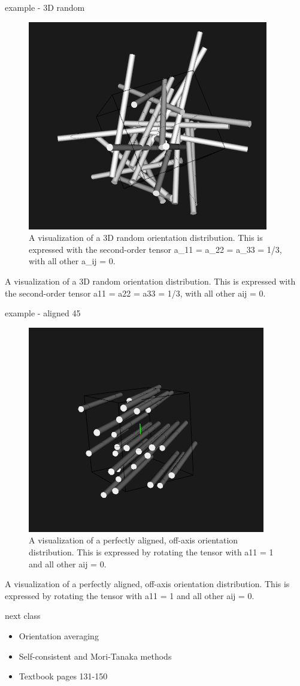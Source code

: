 \documentclass[
  letterpaper,
  ignorenonframetext,
  aspectratio=43,
  handout,
  12pt]{beamer}
\providecommand{\tightlist}{%
  \setlength{\itemsep}{0pt}\setlength{\parskip}{0pt}}
\providecommand{\tightlist}{%
\setlength{\itemsep}{0pt}\setlength{\parskip}{0pt}}
\let\Oldincludegraphics\includegraphics
\renewcommand{\includegraphics}[2][]{\Oldincludegraphics[width=\textwidth,height=0.7\textheight,keepaspectratio]{#2}}
\begin{document}
\begin{frame}{example - 3D random}
\protect\hypertarget{example---3d-random}{}
\begin{figure}
\centering
\includegraphics{../images/random3D.PNG}
\caption{A visualization of a 3D random orientation distribution. This
is expressed with the second-order tensor a\_11 = a\_22 = a\_33 = 1/3,
with all other a\_ij = 0.}
\end{figure}

A visualization of a 3D random orientation distribution. This is
expressed with the second-order tensor a11 = a22 = a33 = 1/3, with all
other aij = 0.
\end{frame}

\begin{frame}{example - aligned 45}
\protect\hypertarget{example---aligned-45}{}
\begin{figure}
\centering
\includegraphics{../images/aligned45.PNG}
\caption{A visualization of a perfectly aligned, off-axis orientation
distribution. This is expressed by rotating the tensor with a11 = 1 and
all other aij = 0.}
\end{figure}

A visualization of a perfectly aligned, off-axis orientation
distribution. This is expressed by rotating the tensor with a11 = 1 and
all other aij = 0.
\end{frame}

\begin{frame}{next class}
\protect\hypertarget{next-class}{}
\begin{itemize}
\tightlist
\item
  Orientation averaging
\item
  Self-consistent and Mori-Tanaka methods
\item
  Textbook pages 131-150
\end{itemize}
\end{frame}
\end{document}
